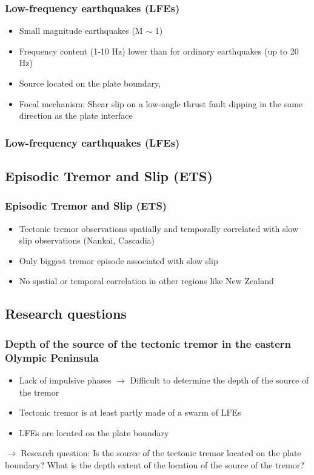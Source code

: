\documentclass{beamer}
\begin{document}
	\begin{frame}
		\frametitle{Low-frequency earthquakes (LFEs)}
		\begin{itemize}
			\item Small magnitude earthquakes (M $\sim$ 1)
			\item Frequency content (1-10 Hz) lower than for ordinary earthquakes (up to 20 Hz)
			\item Source located on the plate boundary,
			\item Focal mechanism: Shear slip on a low-angle thrust fault dipping in the same direction as the plate interface
		\end{itemize}
	\end{frame}

	\begin{frame}
		\frametitle{Low-frequency earthquakes (LFEs)}
	\end{frame}

	\subsection{Episodic Tremor and Slip (ETS)}

	\begin{frame}
		\frametitle{Episodic Tremor and Slip (ETS)}
		\begin{itemize}
			\item Tectonic tremor observations spatially and temporally correlated with slow slip observations (Nankai, Cascadia)
			\item Only biggest tremor episode associated with slow slip
			\item No spatial or temporal correlation in other regions like New Zealand
		\end{itemize}
	\end{frame}
	
	\subsection{Research questions}

	\begin{frame}
		\frametitle{Depth of the source of the tectonic tremor in the eastern Olympic Peninsula}
		\begin{itemize}
			\item Lack of impulsive phases $\rightarrow$ Difficult to determine the depth of the source of the tremor
			\item Tectonic tremor is at least partly made of a swarm of LFEs
			\item LFEs are located on the plate boundary
		\end{itemize}

		\begin{block}{}
			$\rightarrow$ Research question: Is the source of the tectonic tremor located on the plate boundary? What is the depth extent of the location of the source of the tremor?
		\end{block}
	\end{frame}
\end{document}
